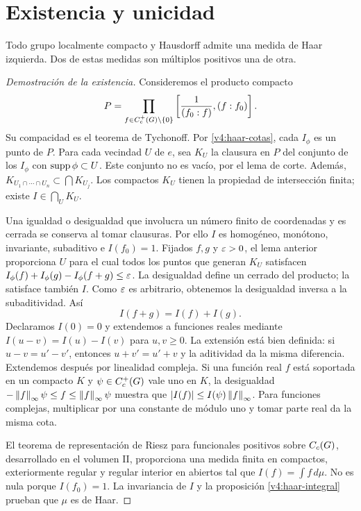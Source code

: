 \section{Existencia y unicidad}
\begin{teorema}[Haar]\label{v4:haar-teorema}
Todo grupo localmente compacto y Hausdorff admite una medida de Haar izquierda. Dos de estas medidas son múltiplos positivos una de otra.
\end{teorema}
\begin{proof}[Demostración de la existencia]
Consideremos el producto compacto
\[
 P=\prod_{f\in C_c^+(G)\setminus\{0\}}
       \left[\frac1{(f_0:f)},(f:f_0)\right].
\]
Su compacidad es el teorema de Tychonoff. Por \eqref{v4:haar-cotas}, cada $I_\phi$ es un punto de $P$. Para cada vecindad $U$ de $e$, sea $K_U$ la clausura en $P$ del conjunto de los $I_\phi$ con $\operatorname{supp}\phi\subset U$. Este conjunto no es vacío, por el lema de corte. Además,
$K_{U_1\cap\cdots\cap U_n}\subset\bigcap K_{U_j}$. Los compactos $K_U$ tienen la propiedad de intersección finita; existe $I\in\bigcap_U K_U$.

Una igualdad o desigualdad que involucra un número finito de coordenadas y es cerrada se conserva al tomar clausuras. Por ello $I$ es homogéneo, monótono, invariante, subaditivo e $I(f_0)=1$. Fijados $f,g$ y $\varepsilon>0$, el lema anterior proporciona $U$ para el cual todos los puntos que generan $K_U$ satisfacen
$I_\phi(f)+I_\phi(g)-I_\phi(f+g)\leq\varepsilon$. La desigualdad define un cerrado del producto; la satisface también $I$. Como $\varepsilon$ es arbitrario, obtenemos la desigualdad inversa a la subaditividad. Así
\[
 I(f+g)=I(f)+I(g).
\]
Declaramos $I(0)=0$ y extendemos a funciones reales mediante $I(u-v)=I(u)-I(v)$ para $u,v\geq0$. La extensión está bien definida: si $u-v=u'-v'$, entonces $u+v'=u'+v$ y la aditividad da la misma diferencia. Extendemos después por linealidad compleja. Si una función real $f$ está soportada en un compacto $K$ y $\psi\in C_c^+(G)$ vale uno en $K$, la desigualdad $-\left\lVert f\right\rVert_\infty\psi\leq f\leq\left\lVert f\right\rVert_\infty\psi$ muestra que
$|I(f)|\leq I(\psi)\left\lVert f\right\rVert_\infty$. Para funciones complejas, multiplicar por una constante de módulo uno y tomar parte real da la misma cota.

El teorema de representación de Riesz para funcionales positivos sobre $C_c(G)$, desarrollado en el volumen II, proporciona una medida finita en compactos, exteriormente regular y regular interior en abiertos tal que $I(f)=\int f\,d\mu$. No es nula porque $I(f_0)=1$. La invariancia de $I$ y la proposición \ref{v4:haar-integral} prueban que $\mu$ es de Haar.
\end{proof}

